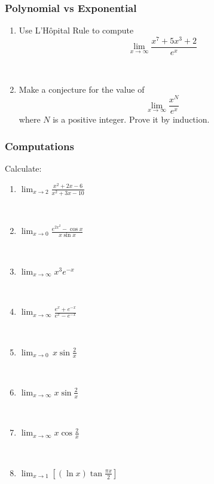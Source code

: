 \documentclass[14pt]{beamer}
\newcommand {\DS} [1] {${\displaystyle #1}$}
\newcommand{\p}{\pause}
\begin{document}
\begin{frame}[t]
\frametitle{Polynomial vs Exponential}

\begin{enumerate}
	\item  Use L'H\^{o}pital Rule to compute 
		$$\lim_{x \to \infty} \frac{x^7 + 5x^3+2}{e^x}$$
		
	\ \p
	\item Make a conjecture for the value of 
		$$ \lim_{x \to \infty} \frac{x^N}{e^x}$$
		where $N$ is a positive integer.
	Prove it by induction.
\end{enumerate}


\end{frame}
\begin{frame}[t]
\frametitle{Computations}

Calculate:

\begin{multicols}{2}
\begin{enumerate}

	\item  \DS{\lim_{x \to 2} \frac{x^2+2x - 6}{x^2+3x-10} }
	
\
	\item  \DS{\lim_{x \to 0} \frac{e^{2x^2} - \cos x}{x \sin x} }
	
\
	\item  \DS{\lim_{x \to \infty}  x^3 e^{-x}}
		
\
	\item \DS{\lim_{x \to \infty} \frac{e^x + e^{-x}}{e^x - e^{-x}} }

\
	\item  \DS{\lim_{x \to 0} \, x \sin \frac{2}{x} }

\
	\item  \DS{\lim_{x \to \infty} x \sin \frac{2}{x} }
	
\
	\item  \DS{\lim_{x \to \infty} x \cos \frac{2}{x} }
	
\
	\item  \DS{\lim_{x \to 1} \left[  \left( \ln x \right)  \tan \frac{\pi x}{2} \right] }

\
\end{enumerate}
\end{multicols}

\end{frame}
\end{document}
